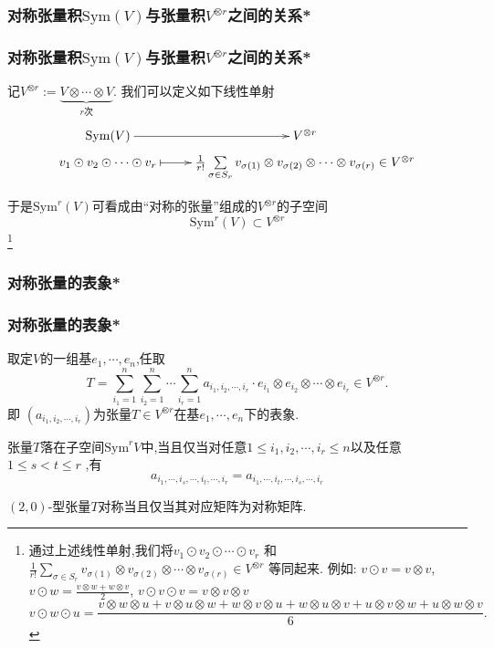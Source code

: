 \subsubsection{对称张量积$\mathrm{Sym}(V)$与张量积$V^{\otimes r}$之间的关系*}
\begin{frame}\frametitle{对称张量积$\mathrm{Sym}(V)$与张量积$V^{\otimes r}$之间的关系*}
记$V^{\otimes r}:=\underbrace{V\otimes \cdots \otimes V}_{r\text{次}}$.
\pp
我们可以定义如下线性单射
\begin{equation*}
\xymatrix@R=0mm{
\mathrm{Sym}(V) \ar[r] & V^{\otimes r}\\
v_1\odot v_2\odot \cdots \odot v_r \ar@{|->}[r]
& \frac1{r!}\sum\limits_{\sigma\in S_r} v_{\sigma(1)}\otimes v_{\sigma(2)} \otimes \cdots \otimes v_{\sigma(r)} \in V^{\otimes r}
}
\end{equation*}
\pp

于是$\mathrm{Sym}^r(V)$可看成由``对称的张量''组成的$V^{\otimes r}$的子空间\\
\[\mathrm{Sym}^r(V)\subset V^{\otimes r}\]
\pp
\footnote{通过上述线性单射,我们将$v_1\odot v_2\odot \cdots \odot v_r$ 和
$\frac1{r!}\sum\limits_{\sigma\in S_r} v_{\sigma(1)}\otimes v_{\sigma(2)} \otimes \cdots \otimes v_{\sigma(r)} \in V^{\otimes r}$ 等同起来. 例如: $v\odot v = v\otimes v$, $v\odot w = \frac{v\otimes w + w\otimes v}{2}$, $v\odot v\odot v = v\otimes v \otimes v$
{\footnotesize
\begin{equation*}
v\odot w\odot u =\frac{v\otimes w \otimes u + v\otimes u \otimes w + w\otimes v \otimes u +  w\otimes u \otimes v +u\otimes v \otimes w + u\otimes w \otimes v }{6}.
\end{equation*}}
}

\end{frame}





\subsubsection{对称张量的表象*}
\begin{frame}\frametitle{对称张量的表象*}
取定$V$的一组基$e_1,\cdots,e_n$,任取
\[T = \sum_{i_1=1}^{n}\sum_{i_2=1}^{n}\cdots\sum_{i_r=1}^{n} a_{i_1,i_2,\cdots,i_r} \cdot e_{i_1}\otimes e_{i_2}\otimes \cdots \otimes e_{i_r}\in V^{\otimes r}.\]
\pp
即 $(a_{i_1,i_2,\cdots,i_r})$为张量$T\in V^{\otimes r}$在基$e_1,\cdots,e_n$下的表象.
\pp
\begin{proposition}
张量$T$落在子空间$\mathrm{Sym}^rV$中,当且仅当对任意$1\leq i_1,i_2,\cdots,i_r\leq n$以及任意$1\leq s<t\leq r$ ,有
\[a_{i_1,\cdots,i_s,\cdots,i_t,\cdots,i_r} = a_{i_1,\cdots,i_t,\cdots,i_s,\cdots,i_r}\]
\end{proposition}

\pp

\begin{example}
$(2,0)$-型张量$T$对称当且仅当其对应矩阵为对称矩阵.
\end{example}
\end{frame}





